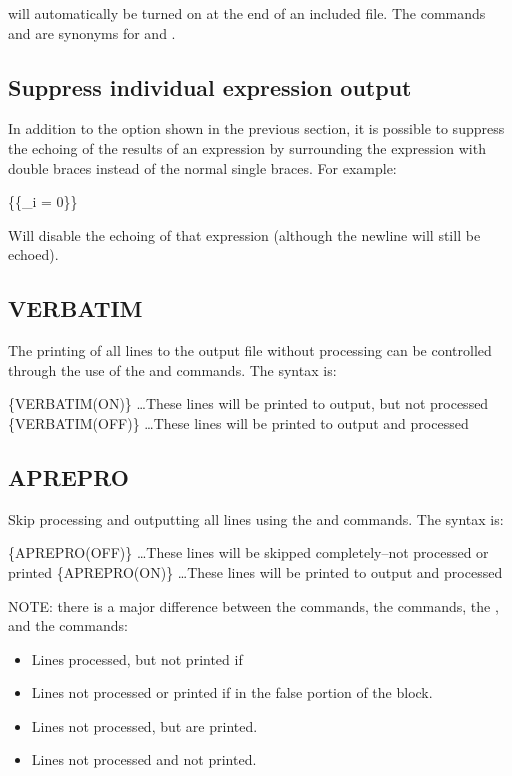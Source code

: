  will automatically be turned on at the end of an included file. The
commands  and  are synonyms for  and .

\subsection{Suppress individual expression output}
In addition to the  option shown in the previous section, it
is possible to suppress the echoing of the results of an expression by
surrounding the expression with double braces instead of the normal
single braces.  For example:
\begin{apinp}
\{\{\_i = 0\}\}
\end{apinp}
Will disable the echoing of that expression (although the newline will
still be echoed). 

\subsection{VERBATIM} The printing of all lines to the output file without processing
can be controlled through the use of the  and 
commands. The syntax is:

\begin{apinp}
\{VERBATIM(ON)\}
\ldots These lines will be printed to output, but not processed
\{VERBATIM(OFF)\}
\ldots These lines will be printed to output and processed
\end{apinp}

\subsection{APREPRO} Skip processing and outputting all lines using the  and 
commands. The syntax is:

\begin{apinp}
\{APREPRO(OFF)\}
\ldots These lines will be skipped completely--not processed or printed
\{APREPRO(ON)\}
\ldots These lines will be printed to output and processed
\end{apinp}

NOTE:  there  is  a  major  difference  between  the   commands,
the commands, the  , and the  commands:

\begin{itemize}
\item {} Lines processed, but not printed if 
\item {} Lines not processed or printed if in the false portion of the  block.
\item {} Lines not processed, but are printed.
\item {} Lines not processed and not printed.
\end{itemize}

